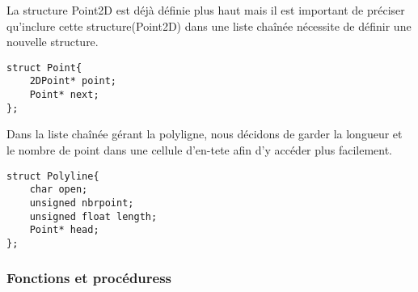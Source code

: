 \documentclass[a4paper, 11pt, oneside]{article}
\begin{document}
La structure Point2D est déjà définie plus haut mais il  est important de préciser qu'inclure cette structure(Point2D) dans une liste chaînée nécessite de définir une nouvelle structure. 
\begin{lstlisting}
struct Point{
	2DPoint* point;
	Point* next;
};
\end{lstlisting}

Dans la liste chaînée gérant la polyligne, nous décidons de garder la longueur et le nombre de point dans une cellule d'en-tete afin d'y accéder plus facilement.
\begin{lstlisting}
struct Polyline{
	char open;
	unsigned nbrpoint;
	unsigned float length;
	Point* head;
};
\end{lstlisting}

\subsubsection{Fonctions et procéduress}
\end{document}
